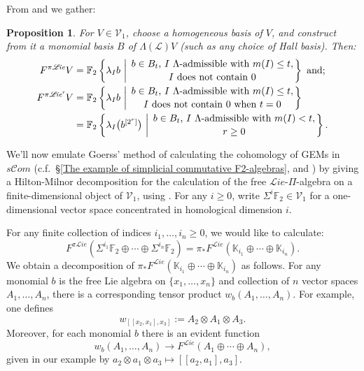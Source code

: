 \documentclass[11pt]{amsart} \renewcommand{\baselinestretch}{1.2}
\theoremstyle{plain}
\newtheorem{prop}[thm]{Proposition}
\theoremstyle{definition}
\renewcommand{\to}{\longrightarrow}
\newcommand{\scrL}{\mathscr{L}}
\newcommand{\scrC}{\mathscr{C}}
\newcommand{\calV}{\mathcal{V}}
\newcommand{\citeBOX}[2][]{\cite[\mbox{#1}]{#2}}
\newcommand{\LieOperad}{{\scrL}}
\newcommand{\restnRepeated}[2]{#1^{[2^{#2}]}}
\newcommand{\vect}[2]{\calV^{#1}_{#2}}
\newcommand{\PA}[1]{\pi#1}
\newcommand{\minDimDelta}{m}
\newcommand{\F}{\mathbb{F}}
\newcommand{\algs}{{\scrC\!\textit{om}}}
\newcommand{\liealgs}{{\scrL\!\textit{ie}}}
\newcommand{\restliealgs}{{\scrL\!\textit{ie}^\textit{r}}}
\newcommand{\Ftwo}{\F_2}
\renewcommand{\mapsto}{\longmapsto}
\begin{document}
\begin{Constructing homotopy operations}
From  \cite[Theorem 8.8 and proof]{CurtisSimplicialHtpy.pdf} and \cite{6Author.pdf} we gather:
\begin{prop}
\label{Lie homotopy operations}
For $V\in\vect{}{1}$,   choose a homogeneous basis of $V$, and construct from it a monomial  basis $B$ of $\Lambda(\LieOperad)V$ (such as any choice of Hall basis). Then:
\begin{align*}
F^{\PA{\liealgs}}V&=\Ftwo \left\{\lambda_Ib\ \middle|\ \genfrac{}{}{0pt}{}{b\in B_t\textup{, $I$ $\Lambda$-admissible with }\minDimDelta(I)\leq t,}{\textup{$I$ does not contain 0}}\right\}\textup{ and;}
\\
F^{\PA{\restliealgs}}V&=\Ftwo \left\{\lambda_Ib\ \middle|\ \genfrac{}{}{0pt}{}{b\in B_t\textup{, $I$ $\Lambda$-admissible with }\minDimDelta(I)\leq t,}{\textup{$I$ does not contain 0 when $t=0$}}\right\}
\\
&=\Ftwo \left\{\lambda_I\bigl(\restnRepeated{b}{r}\bigr)\ \middle|\ \genfrac{}{}{0pt}{}{b\in B_t\textup{, $I$ $\Lambda$-admissible with }\minDimDelta(I)< t,}{\textup{$r\geq0$}}\right\}.
\end{align*}
\end{prop}
We'll now emulate  Goerss' method of calculating the cohomology of GEMs in $s\algs$ (c.f.\ \S\ref{The example of simplicial commutative F2-algebras}, \cite{GoerssHiltonMilnor.pdf} and \citeBOX[\S11]{MR1089001}) by giving a Hilton-Milnor decomposition for the calculation of the free $\liealgs$-$\Pi$-algebra on a finite-dimensional object of $\vect{}{1}$, using \cite[Proposition 3.1]{Schles-SimpLieRing.pdf}. For any $i\geq0$, write $\Sigma^i\Ftwo \in\vect{}{1}$ for a one-dimensional vector space concentrated in homological dimension $i$.

For any finite collection of indices $i_1,\ldots,i_n\geq 0$, we would like to calculate:
\[F^{\PA{\liealgs}}(\Sigma^{i_1}\Ftwo\oplus\cdots \oplus\Sigma^{i_n}\Ftwo)=\pi_*F^\liealgs(\mathbb{K}_{i_1}\oplus\cdots \oplus \mathbb{K}_{i_n}).\]
We obtain a decomposition of $\pi_*F^\liealgs(\mathbb{K}_{i_1}\oplus\cdots \oplus \mathbb{K}_{i_n})$ as follows. For any monomial $b$ is the free Lie algebra on $\{x_1,\ldots,x_n\}$ and collection of $n$ vector spaces $A_{1},\ldots,A_n$, there is a corresponding tensor product $w_b(A_{1},\ldots,A_n)$. For example, one defines
\[w_{[[x_2,x_1],x_3]}:=A_2\otimes A_1\otimes A_3.\]
Moreover, for each monomial $b$ there is an evident function \[w_b(A_1,\ldots,A_n)\to F^\liealgs(A_1\oplus\cdots\oplus A_n),\]
given in our example by $a_2\otimes a_1\otimes a_3\mapsto [[a_2,a_1],a_3]$.


\end{Constructing homotopy operations}
\end{document}
